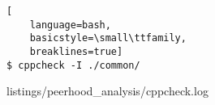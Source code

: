 \ApplyOnePageAppendixPageStyle{}

\begin{lstlisting}[
	language=bash,
	basicstyle=\small\ttfamily,
	breaklines=true]
$ cppcheck -I ./common/
\end{lstlisting}


	{listings/peerhood_analysis/cppcheck.log}
